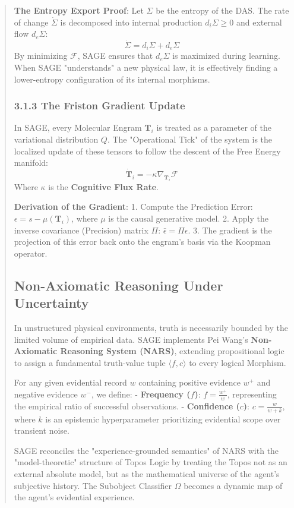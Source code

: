\documentclass[10pt,twocolumn,letterpaper]{article}
\begin{document}
\begin{abstract}
\textbf{The Entropy Export Proof}:
Let $\Sigma$ be the entropy of the DAS. The rate of change $\dot{\Sigma}$ is decomposed into internal production $d_i \Sigma \ge 0$ and external flow $d_e \Sigma$:
$$ \dot{\Sigma} = d_i \Sigma + d_e \Sigma $$
By minimizing $\mathcal{F}$, SAGE ensures that $d_e \Sigma$ is maximized during learning. When SAGE "understands" a new physical law, it is effectively finding a lower-entropy configuration of its internal morphisms. 

\subsubsection{3.1.3 The Friston Gradient Update}
In SAGE, every Molecular Engram $\mathbf{T}_i$ is treated as a parameter of the variational distribution $Q$. The "Operational Tick" of the system is the localized update of these tensors to follow the descent of the Free Energy manifold:
$$ \dot{\mathbf{T}}_i = - \kappa \nabla_{\mathbf{T}_i} \mathcal{F} $$
Where $\kappa$ is the \textbf{Cognitive Flux Rate}.

\textbf{Derivation of the Gradient}:
1.  Compute the Prediction Error: $\epsilon = s - \mu(\mathbf{T}_i)$, where $\mu$ is the causal generative model.
2.  Apply the inverse covariance (Precision) matrix $\Pi$: $\bar{\epsilon} = \Pi \epsilon$.
3.  The gradient is the projection of this error back onto the engram's basis via the Koopman operator.

\subsection{Non-Axiomatic Reasoning Under Uncertainty}

In unstructured physical environments, truth is necessarily bounded by the limited volume of empirical data. SAGE implements Pei Wang’s \textbf{Non-Axiomatic Reasoning System (NARS)}, extending propositional logic to assign a fundamental truth-value tuple $\langle f, c \rangle$ to every logical Morphism.

For any given evidential record $w$ containing positive evidence $w^+$ and negative evidence $w^-$, we define:
- \textbf{Frequency ($f$)}: $f = \frac{w^+}{w}$, representing the empirical ratio of successful observations.
- \textbf{Confidence ($c$)}: $c = \frac{w}{w + k}$, where $k$ is an epistemic hyperparameter prioritizing evidential scope over transient noise.

SAGE reconciles the "experience-grounded semantics" of NARS with the "model-theoretic" structure of Topos Logic by treating the Topos not as an external absolute model, but as the mathematical universe of the agent's subjective history. The Subobject Classifier $\Omega$ becomes a dynamic map of the agent's evidential experience.


\end{abstract}
\end{document}
